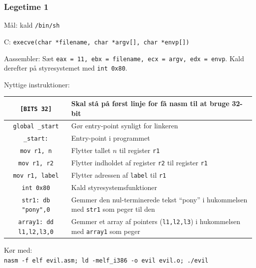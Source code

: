 \documentclass[slidestop,compress,mathserif, xcolor=table]{beamer}
\begin{document}
\begin{frame}[c]
    \frametitle{Legetime 1}

    {\scriptsize

    \pause Mål: kald \texttt{/bin/sh} \vskip5pt

    \pause C: \texttt{execve(char *filename, char *argv[], char
      *envp[])}\vskip5pt

    \pause Aassembler: Sæt \texttt{eax = 11, ebx = filename, ecx = argv, edx =
      envp}. Kald derefter på styresystemet med \texttt{int 0x80}.\vskip5pt

    \pause Nyttige instruktioner:

    \begin{tabular}{|c|p{6cm}|}
      \hline
      \texttt{[BITS 32]} & Skal stå på først linje for få nasm til at bruge
      32-bit \\\hline

      \texttt{global \_start} & Gør entry-point synligt for linkeren\\\hline

      \texttt{\_start:} & Entry-point i programmet \\\hline

      \texttt{mov r1, n} & Flytter tallet $n$ til register \texttt{r1} \\\hline

      \texttt{mov r1, r2} & Flytter indholdet af register \texttt{r2} til
      register \texttt{r1} \\\hline

      \texttt{mov r1, label} & Flytter adressen af \texttt{label} til
      \texttt{r1} \\\hline

      \texttt{int 0x80} & Kald styresystemsfunktioner \\\hline

      \texttt{str1: db "pony",0} & Gemmer den nul-terminerede tekst ``pony'' i
      hukommelsen med \texttt{str1} som peger til den \\\hline

      \texttt{array1: dd l1,l2,l3,0} & Gemmer et array af pointers
      (\texttt{l1,l2,l3}) i hukommelsen med \texttt{array1} som
      peger\\\hline

    \end{tabular} \vskip5pt

    \pause Kør med:\\
    \texttt{nasm -f elf evil.asm; ld -melf\_i386 -o evil evil.o; ./evil}

    }
\end{frame}
\end{document}
